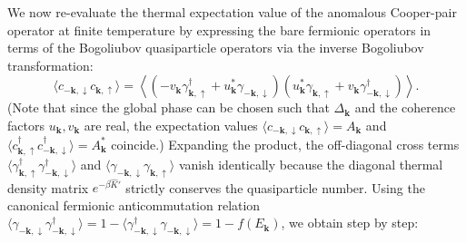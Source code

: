 We now re-evaluate the thermal expectation value of the anomalous Cooper-pair operator at finite temperature by expressing the bare fermionic operators in terms of the Bogoliubov quasiparticle operators via the inverse Bogoliubov transformation:
\[
    \langle c_{-\mathbf{k},\downarrow} c_{\mathbf{k},\uparrow} \rangle = \left\langle \left( -v_{\mathbf{k}} \gamma_{\mathbf{k},\uparrow}^\dagger + u_{\mathbf{k}}^* \gamma_{-\mathbf{k},\downarrow} \right) \left( u_{\mathbf{k}}^* \gamma_{\mathbf{k},\uparrow} + v_{\mathbf{k}} \gamma_{-\mathbf{k},\downarrow}^\dagger \right) \right\rangle.
\]
(Note that since the global phase can be chosen such that \( \Delta_{\mathbf{k}} \) and the coherence factors \( u_{\mathbf{k}}, v_{\mathbf{k}} \) are real, the expectation values \( \langle c_{-\mathbf{k},\downarrow} c_{\mathbf{k},\uparrow} \rangle = A_{\mathbf{k}} \) and \( \langle c_{\mathbf{k},\uparrow}^\dagger c_{-\mathbf{k},\downarrow}^\dagger \rangle = A_{\mathbf{k}}^* \) coincide.) Expanding the product, the off-diagonal cross terms \( \langle \gamma_{\mathbf{k},\uparrow}^\dagger \gamma_{-\mathbf{k},\downarrow}^\dagger \rangle \) and \( \langle \gamma_{-\mathbf{k},\downarrow} \gamma_{\mathbf{k},\uparrow} \rangle \) vanish identically because the diagonal thermal density matrix \( e^{-\beta \hat{K}'} \) strictly conserves the quasiparticle number. Using the canonical fermionic anticommutation relation \( \langle \gamma_{-\mathbf{k},\downarrow} \gamma_{-\mathbf{k},\downarrow}^\dagger \rangle = 1 - \langle \gamma_{-\mathbf{k},\downarrow}^\dagger \gamma_{-\mathbf{k},\downarrow} \rangle = 1 - f(E_{\mathbf{k}}) \), we obtain step by step:
